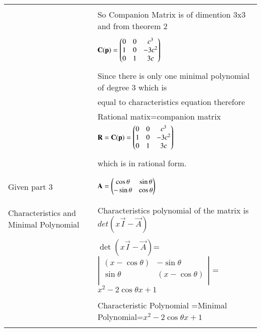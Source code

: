 \documentclass[journal,12pt]{IEEEtran}
\begin{document}
\begin{longtable}{|l|l|}
&\\
&So Companion Matrix is of dimention 3x3 and from theorem 2\\
&\\
&$\mathbf{C(p)}=\begin{pmatrix}0&0&c^3\\1&0&-3c^2\\0&1&3c\end{pmatrix}$\\
&\\
&Since there is only one minimal polynomial of degree 3 
which is\\ &equal to characteristics equation therefore\\ &Rational matix=companion matrix\\ 
&$\mathbf{R}=\mathbf{C(p)}=\begin{pmatrix}0&0&c^3\\1&0&-3c^2\\0&1&3c\end{pmatrix}$\\
&\\
&which is in rational form.\\
&\\
\hline \hline
\multirow{3}{*}{Given part 3} & \\
&$\mathbf{A}=\begin{pmatrix}\cos\theta&\sin\theta\\-\sin\theta&\cos\theta\end{pmatrix}$\\
&\\
\hline


\multirow{3}{*}{Characteristics and Minimal Polynomial} & \\
&
Characteristics polynomial of the matrix  is $det(x\vec{I}-\vec{A})$\\ 
&\\
& $\det(x\vec{I}-\vec{A})$= $\left|
                \begin{array}{ccc}
                (x-\cos\theta) & -\sin\theta\\
                \sin\theta & (x-\cos\theta)\\
                \end{array} \right|$ =$x^2-2\cos\theta x +1$\\
&\\
& Characteristic Polynomial =Minimal Polynomial=$x^2-2\cos\theta x +1$\\
&\\


\end{longtable}
\end{document}
